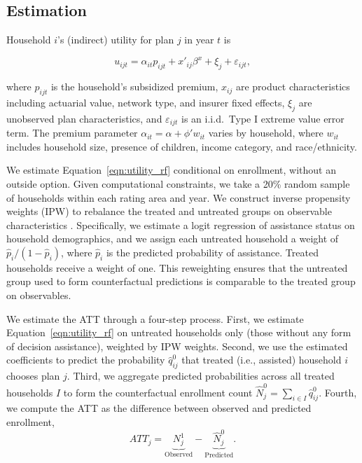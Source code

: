\documentclass[12pt]{article}
\begin{document}
\subsection{Estimation}
\label{subsec:causal-methods}

Household $i$'s (indirect) utility for plan $j$ in year $t$ is 


\begin{equation}
\label{eqn:utility_rf}
u_{ijt} = \alpha_{it} p_{ijt} + x'_{ij}\beta^x + \xi_j + \varepsilon_{ijt},
\end{equation}

\noindent where $p_{ijt}$ is the household's subsidized premium, $x_{ij}$ are product characteristics including actuarial value, network type, and insurer fixed effects, $\xi_j$ are unobserved plan characteristics, and $\varepsilon_{ijt}$ is an i.i.d.\ Type I extreme value error term. The premium parameter  $\alpha_{it} = \alpha + \phi' w_{it}$ varies by household, where $w_{it}$ includes household size, presence of children, income category, and race/ethnicity. 

We estimate Equation~\eqref{eqn:utility_rf} conditional on enrollment, without an outside option.  Given computational constraints, we take a 20\% random sample of households within each rating area and year.   We construct inverse propensity weights (IPW) to rebalance the treated and untreated groups on observable characteristics \citep{wooldridge2010}. Specifically, we estimate a logit regression of assistance status on household demographics, and we assign each untreated household a weight of $\hat{p}_{i}/(1-\hat{p}_{i})$, where $\hat{p}_{i}$ is the predicted probability of assistance. Treated households receive a weight of one. This reweighting ensures that the untreated group used to form counterfactual predictions is comparable to the treated group on observables.

We estimate the ATT through a four-step process. First, we estimate Equation~\eqref{eqn:utility_rf} on untreated households only (those without any form of decision assistance), weighted by IPW weights. Second, we use the estimated coefficients to predict the probability $\widehat{q}_{ij}^0$ that treated (i.e., assisted) household $i$ chooses plan $j$. Third, we aggregate predicted probabilities across all treated households $I$ to form the counterfactual enrollment count $\widehat{N}_j^0 = \sum_{i \in {I}} \widehat{q}_{ij}^0 $. Fourth, we compute the ATT as the difference between observed and predicted enrollment,
\begin{equation}
    ATT_{j} = \underbrace{N^{1}_{j}}_{\text{Observed}} - \underbrace{\widehat{N}_{j}^{0}}_{\text{Predicted}}.
\label{eqn:att}
\end{equation}
\end{document}
